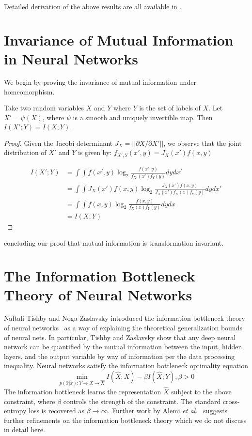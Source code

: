 Detailed derivation of the above results are all available in \cite{coverthomas2006}.

\section{Invariance of Mutual Information in Neural Networks}

We begin by proving the invariance of mutual information under homeomorphism.

\begin{theorem}
Take two random variables $X$ and $Y$ where $Y$ is the set of labels of $X$.
Let $X' = \psi(X)$, where $\psi$ is a smooth and uniquely invertible map.
Then $I(X'; Y) = I(X; Y)$.
\end{theorem}

\begin{proof}
Given the Jacobi determinant $J_X = ||\partial X/ \partial X'||$, we observe that the joint distribution of $X'$ and $Y$ is given by: $f_{X', Y}(x', y) = J_X(x')f(x, y)$

\begin{align*}
I(X'; Y) & = \int \int f(x', y) \log_2 \frac{f(x', y)}{f_{X'}(x') f_{Y}(y)} dy dx'\\
& = \int \int J_X(x')f(x, y) \log_2 \frac{J_X(x')f(x, y)}{J_X(x')f_{X}(x)f_{Y}(y)} dy dx'\\
& = \int \int f(x, y) \log_2 \frac{f(x, y)}{f_{X}(x) f_{Y}(y)} dy dx \\
& = I(X; Y)
\end{align*}
\end{proof}
concluding our proof that mutual information is transformation invariant. 

\section{The Information Bottleneck Theory of Neural Networks}
Naftali Tishby and Noga Zaslavsky introduced the information bottleneck theory of neural networks~\cite{tishby2015deep} as a way of explaining the theoretical generalization bounds of neural nets.
In particular, Tishby and Zaslavsky show that any deep neural network can be quantified by the mutual information between the input, hidden layers, and the output variable by way of information per the data processing inequality.
Neural networks satisfy the information bottleneck optimality equation
$$\min_{p(\hat{x}|x):Y \to X \to \hat{X}} I(\hat{X};X) - \beta I(\hat{X}; Y) , \beta > 0$$
The information bottleneck learns the representation $\hat{X}$ subject to the above constraint, where $\beta$ controls the strength of the constraint.
The standard cross-entropy loss is recovered as $\beta \to \infty$. 
Further work by Alemi \textit{et al.}~\cite{alemi2016deep} suggests further refinements on the information bottleneck theory which we do not discuss in detail here. 

